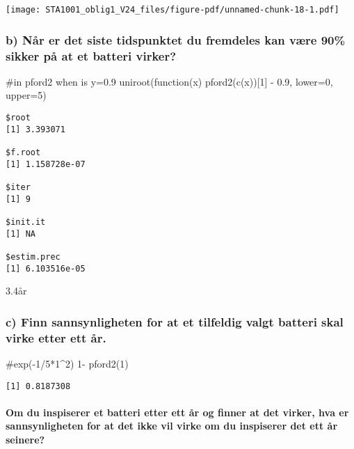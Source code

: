 \documentclass[
  12pt,
  a4paper,
  DIV=11,
  numbers=noendperiod]{scrartcl}
\let\oldparagraph\paragraph
\renewcommand{\paragraph}[1]{\oldparagraph{#1}\mbox{}}
\newenvironment{Shaded}{\begin{snugshade}}{\end{snugshade}}
\newcommand{\AttributeTok}[1]{\textcolor[rgb]{0.40,0.45,0.13}{#1}}
\newcommand{\CommentTok}[1]{\textcolor[rgb]{0.37,0.37,0.37}{#1}}
\newcommand{\ControlFlowTok}[1]{\textcolor[rgb]{0.00,0.23,0.31}{#1}}
\newcommand{\DecValTok}[1]{\textcolor[rgb]{0.68,0.00,0.00}{#1}}
\newcommand{\FloatTok}[1]{\textcolor[rgb]{0.68,0.00,0.00}{#1}}
\newcommand{\FunctionTok}[1]{\textcolor[rgb]{0.28,0.35,0.67}{#1}}
\newcommand{\NormalTok}[1]{\textcolor[rgb]{0.00,0.23,0.31}{#1}}
\newcommand{\SpecialCharTok}[1]{\textcolor[rgb]{0.37,0.37,0.37}{#1}}
\begin{document}
\texttt{[image: STA1001\_oblig1\_V24\_files/figure-pdf/unnamed-chunk-18-1.pdf]}

\subsubsection{b) Når er det siste tidspunktet du fremdeles kan være
90\% sikker på at et batteri
virker?}\label{b-nuxe5r-er-det-siste-tidspunktet-du-fremdeles-kan-vuxe6re-90-sikker-puxe5-at-et-batteri-virker}

\begin{Shaded}
\begin{Highlighting}[]
\CommentTok{\#in pford2 when is y=0.9}
\FunctionTok{uniroot}\NormalTok{(}\ControlFlowTok{function}\NormalTok{(x) }\FunctionTok{pford2}\NormalTok{(}\FunctionTok{c}\NormalTok{(x))[}\DecValTok{1}\NormalTok{] }\SpecialCharTok{{-}} \FloatTok{0.9}\NormalTok{, }\AttributeTok{lower=}\DecValTok{0}\NormalTok{, }\AttributeTok{upper=}\DecValTok{5}\NormalTok{)}
\end{Highlighting}
\end{Shaded}

\begin{verbatim}
$root
[1] 3.393071

$f.root
[1] 1.158728e-07

$iter
[1] 9

$init.it
[1] NA

$estim.prec
[1] 6.103516e-05
\end{verbatim}

3.4år

\subsubsection{c) Finn sannsynligheten for at et tilfeldig valgt batteri
skal virke etter ett
år.}\label{c-finn-sannsynligheten-for-at-et-tilfeldig-valgt-batteri-skal-virke-etter-ett-uxe5r.}

\begin{Shaded}
\begin{Highlighting}[]
\CommentTok{\#exp({-}1/5*1\^{}2)}
\DecValTok{1}\SpecialCharTok{{-}} \FunctionTok{pford2}\NormalTok{(}\DecValTok{1}\NormalTok{)}
\end{Highlighting}
\end{Shaded}

\begin{verbatim}
[1] 0.8187308
\end{verbatim}

\paragraph{Om du inspiserer et batteri etter ett år og finner at det
virker, hva er sannsynligheten for at det ikke vil virke om du
inspiserer det ett år
seinere?}\label{om-du-inspiserer-et-batteri-etter-ett-uxe5r-og-finner-at-det-virker-hva-er-sannsynligheten-for-at-det-ikke-vil-virke-om-du-inspiserer-det-ett-uxe5r-seinere}
\end{document}
